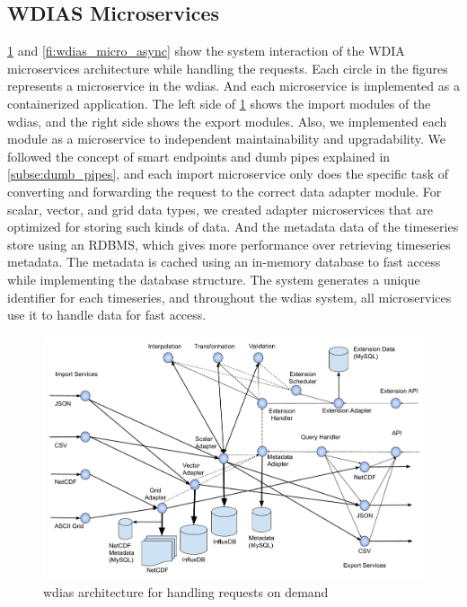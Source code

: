 \subsection{WDIAS Microservices}
\label{sebse:wdias_microservices}

\cref{fi:wdias_micro_on_demand} and \cref{fi:wdias_micro_async} show the system interaction of the WDIA microservices architecture while handling the requests. Each circle in the figures represents a microservice in the \acrshort{wdias}. And each microservice is implemented as a containerized application. The left side of \cref{fi:wdias_micro_on_demand} shows the import modules of the \acrshort{wdias}, and the right side shows the export modules. Also, we implemented each module as a microservice to independent maintainability and upgradability. We followed the concept of smart endpoints and dumb pipes explained in \cref{subse:dumb_pipes}, and each import microservice only does the specific task of converting and forwarding the request to the correct data adapter module. For scalar, vector, and grid data types, we created adapter microservices that are optimized for storing such kinds of data. And the metadata data of the timeseries store using an RDBMS, which gives more performance over retrieving timeseries metadata. The metadata is cached using an in-memory database to fast access while implementing the database structure. The system generates a unique identifier for each timeseries, and throughout the \acrshort{wdias} system, all microservices use it to handle data for fast access.

\begin{figure}[htp]
    \centering
    \includegraphics[width=1\textwidth]{method/microservice/microservice_architecture-handle_on_demand-v4.pdf}
    \caption{\acrshort{wdias} architecture for handling requests on demand}
    \label{fi:wdias_micro_on_demand}
\end{figure}

